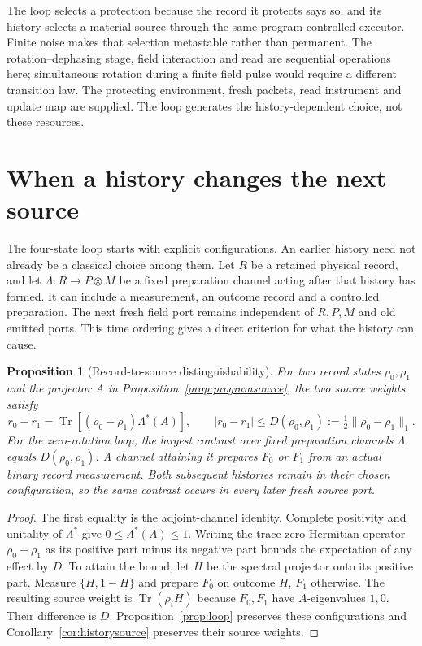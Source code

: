 \documentclass[12pt,a4paper]{article}
\newtheorem{proposition}[theorem]{Proposition}
\newcommand{\Tr}{\operatorname{Tr}}
\begin{document}
The loop selects a protection because the record it protects says so, and its history selects a material source through the same program-controlled executor. Finite noise makes that selection metastable rather than permanent. The rotation--dephasing stage, field interaction and read are sequential operations here; simultaneous rotation during a finite field pulse would require a different transition law. The protecting environment, fresh packets, read instrument and update map are supplied. The loop generates the history-dependent choice, not these resources.

\section{When a history changes the next source}
\label{sec:recordsource}

The four-state loop starts with explicit configurations. An earlier history need not already be a classical choice among them. Let $R$ be a retained physical record, and let $\Lambda:R\to P\otimes M$ be a fixed preparation channel acting after that history has formed. It can include a measurement, an outcome record and a controlled preparation. The next fresh field port remains independent of $R,P,M$ and old emitted ports. This time ordering gives a direct criterion for what the history can cause.

\begin{proposition}[Record-to-source distinguishability]
\label{prop:recordsource}
For two record states $\rho_0,\rho_1$ and the projector $A$ in Proposition~\ref{prop:programsource}, the two source weights satisfy
\[
 r_0-r_1=\Tr[(\rho_0-\rho_1)\Lambda^*(A)],\qquad
 |r_0-r_1|\le D(\rho_0,\rho_1):=\tfrac12\|\rho_0-\rho_1\|_1.
 \label{eq:recordsource}
\]
For the zero-rotation loop, the largest contrast over fixed preparation channels $\Lambda$ equals $D(\rho_0,\rho_1)$. A channel attaining it prepares $F_0$ or $F_1$ from an actual binary record measurement. Both subsequent histories remain in their chosen configuration, so the same contrast occurs in every later fresh source port.
\end{proposition}

\begin{proof}
The first equality is the adjoint-channel identity. Complete positivity and unitality of $\Lambda^*$ give $0\le\Lambda^*(A)\le1$. Writing the trace-zero Hermitian operator $\rho_0-\rho_1$ as its positive part minus its negative part bounds the expectation of any effect by $D$. To attain the bound, let $H$ be the spectral projector onto its positive part. Measure $\{H,1-H\}$ and prepare $F_0$ on outcome $H$, $F_1$ otherwise. The resulting source weight is $\Tr(\rho_iH)$ because $F_0,F_1$ have $A$-eigenvalues $1,0$. Their difference is $D$. Proposition~\ref{prop:loop} preserves these configurations and Corollary~\ref{cor:historysource} preserves their source weights.
\end{proof}
\end{document}
